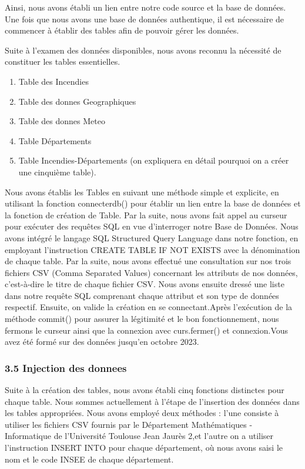 \documentclass[
]{article}
\providecommand{\tightlist}{%
  \setlength{\itemsep}{0pt}\setlength{\parskip}{0pt}}
\begin{document}
Ainsi, nous avons établi un lien entre notre code source et la base de
données. Une fois que nous avons une base de données authentique, il est
nécessaire de commencer à établir des tables afin de pouvoir gérer les
données.

Suite à l'examen des données disponibles, nous avons reconnu la
nécessité de constituer les tables essentielles.

\begin{enumerate}
\def\labelenumi{\arabic{enumi}.}
\tightlist
\item
  Table des Incendies
\item
  Table des donnes Geographiques
\item
  Table des donnes Meteo
\item
  Table Départements
\item
  Table Incendies-Départements (on expliquera en détail pourquoi on a
  créer une cinquième table).
\end{enumerate}

Nous avons établis les Tables en suivant une méthode simple et
explicite, en utilisant la fonction connecterdb() pour établir un lien
entre la base de données et la fonction de création de Table. Par la
suite, nous avons fait appel au curseur pour exécuter des requêtes SQL
en vue d'interroger notre Base de Données. Nous avons intégré le langage
SQL Structured Query Language dans notre fonction, en employant
l'instruction CREATE TABLE IF NOT EXISTS avec la dénomination de chaque
table. Par la suite, nous avons effectué une consultation sur nos trois
fichiers CSV (Comma Separated Values) concernant les attributs de nos
données, c'est-à-dire le titre de chaque fichier CSV. Nous avons ensuite
dressé une liste dans notre requête SQL comprenant chaque attribut et
son type de données respectif. Ensuite, on valide la création en se
connectant.Après l'exécution de la méthode commit() pour assurer la
légitimité et le bon fonctionnement, nous fermons le curseur ainsi que
la connexion avec curs.fermer() et connexion.Vous avez été formé sur des
données jusqu'en octobre 2023.

\subsubsection{3.5 Injection des donnees}\label{injection-des-donnees}

Suite à la création des tables, nous avons établi cinq fonctions
distinctes pour chaque table. Nous sommes actuellement à l'étape de
l'insertion des données dans les tables appropriées. Nous avons employé
deux méthodes : l'une consiste à utiliser les fichiers CSV fournis par
le Département Mathématiques - Informatique de l'Université Toulouse
Jean Jaurès 2,et l'autre on a utiliser l'instruction INSERT INTO pour
chaque département, où nous avons saisi le nom et le code INSEE de
chaque département.
\end{document}
